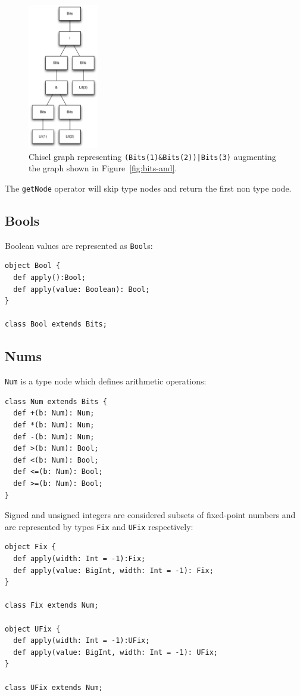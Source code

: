 \documentclass[10pt,twocolumn]{article}
\def\code#1{{\small\tt #1}}
\begin{document}
\begin{figure}[h]
\centering
\includegraphics[height=2.5in]{figs/bits-or-and.pdf}
\caption{Chisel graph representing 
  {\tt\footnotesize (Bits(1)\&Bits(2))|Bits(3)} augmenting the graph
  shown in Figure~\ref{fig:bits-and}.}
\label{fig:bits-or-and}
\end{figure}

\noindent
The \code{getNode} operator will skip type nodes and return the first
non type node.

\subsection{Bools}

Boolean values are represented as \code{Bool}s:

\begin{lstlisting}
object Bool {
  def apply():Bool;
  def apply(value: Boolean): Bool;
}

class Bool extends Bits;
\end{lstlisting}

\subsection{Nums}

\code{Num} is a type node which defines arithmetic operations:

\begin{lstlisting}
class Num extends Bits {
  def +(b: Num): Num;
  def *(b: Num): Num;
  def -(b: Num): Num;
  def >(b: Num): Bool;
  def <(b: Num): Bool;
  def <=(b: Num): Bool;
  def >=(b: Num): Bool;
}
\end{lstlisting}

Signed and unsigned integers
are considered subsets of fixed-point numbers and are represented by
types \code{Fix} and \code{UFix} respectively:

\begin{lstlisting}
object Fix {
  def apply(width: Int = -1):Fix;
  def apply(value: BigInt, width: Int = -1): Fix;
}

class Fix extends Num; 

object UFix {
  def apply(width: Int = -1):UFix;
  def apply(value: BigInt, width: Int = -1): UFix;
}

class UFix extends Num; 
\end{lstlisting}
\end{document}
